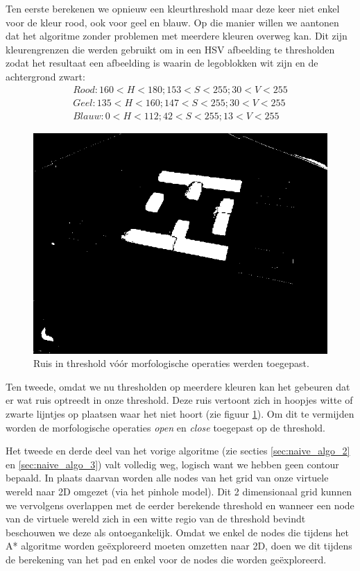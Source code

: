 Ten eerste berekenen we opnieuw een kleurthreshold maar deze keer niet enkel voor de kleur rood, ook voor geel en blauw. Op die manier  willen we aantonen dat het algoritme zonder problemen met meerdere kleuren overweg kan. Dit zijn kleurengrenzen die werden gebruikt om in een HSV afbeelding te thresholden zodat het resultaat een afbeelding is waarin de legoblokken wit zijn en de achtergrond zwart:
\begin{align*}
Rood: 160 < H < 180; 153 < S < 255; 30 < V < 255 \\
Geel: 135 < H < 160; 147 < S < 255; 30 < V < 255 \\
Blauw: 0 < H < 112; 42 < S < 255; 13 < V < 255
\end{align*}

\begin{figure}
  \centering
  \includegraphics[width=0.5\linewidth]{img/alg2Noise}
  \caption{Ruis in threshold v\'o\'or morfologische operaties werden toegepast.}
  \label{fig:algo2_noise}
\end{figure}

Ten tweede, omdat we nu thresholden op meerdere kleuren kan het gebeuren dat er wat ruis optreedt in onze threshold. Deze ruis vertoont zich in hoopjes witte of zwarte lijntjes op plaatsen waar het niet hoort (zie figuur \ref{fig:algo2_noise}). Om dit te vermijden worden de morfologische operaties \textit{open} en \textit{close} toegepast op de threshold.

Het tweede en derde deel van het vorige algoritme (zie secties \ref{sec:naive_algo_2} en \ref{sec:naive_algo_3}) valt volledig weg, logisch want we hebben geen contour bepaald. In plaats daarvan worden alle nodes van het grid van onze virtuele wereld naar 2D omgezet (via het pinhole model). Dit 2 dimensionaal grid kunnen we vervolgens overlappen met de eerder berekende threshold en wanneer een node van de virtuele wereld zich in een witte regio van de threshold bevindt beschouwen we deze als ontoegankelijk. Omdat we enkel de nodes die tijdens het A* algoritme worden ge\"exploreerd moeten omzetten naar 2D, doen we dit tijdens de berekening van het pad en enkel voor de nodes die worden ge\"exploreerd.

